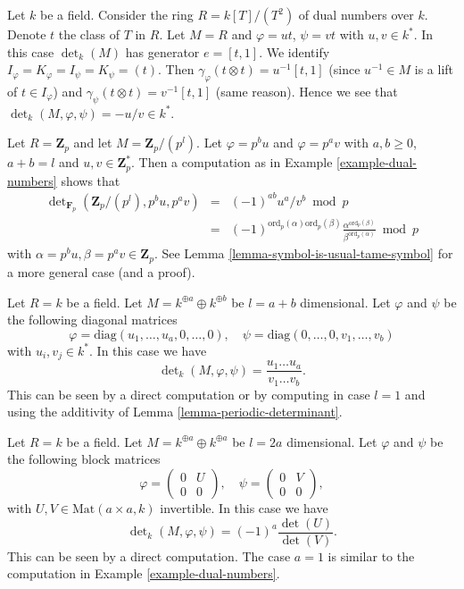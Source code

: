 \begin{example}
\label{example-dual-numbers}
Let $k$ be a field.
Consider the ring $R = k[T]/(T^2)$ of dual numbers over $k$.
Denote $t$ the class of $T$ in $R$.
Let $M = R$ and $\varphi = ut$, $\psi = vt$ with $u, v \in k^*$.
In this case $\det_k(M)$ has generator $e = [t, 1]$.
We identify $I_\varphi = K_\varphi = I_\psi = K_\psi = (t)$.
Then $\gamma_\varphi(t \otimes t) = u^{-1}[t, 1]$
(since $u^{-1} \in M$ is a lift of $t \in I_\varphi$)
and $\gamma_\psi(t \otimes t) = v^{-1}[t, 1]$ (same reason).
Hence we see that $\det_k(M, \varphi, \psi) = -u/v \in k^*$.
\end{example}

\begin{example}
\label{example-Zp}
Let $R = \mathbf{Z}_p$ and let $M = \mathbf{Z}_p/(p^l)$.
Let $\varphi = p^b u$ and $\varphi = p^a v$ with $a, b \geq 0$,
$a + b = l$ and $u, v \in \mathbf{Z}_p^*$.
Then a computation as in Example \ref{example-dual-numbers}
shows that
\begin{eqnarray*}
\det\nolimits_{\mathbf{F}_p}(\mathbf{Z}_p/(p^l), p^bu, p^av) & = &
(-1)^{ab}u^a/v^b \bmod p \\
& = &
(-1)^{\text{ord}_p(\alpha)\text{ord}_p(\beta)}
\frac{\alpha^{\text{ord}_p(\beta)}}{\beta^{\text{ord}_p(\alpha)}} \bmod p
\end{eqnarray*}
with $\alpha = p^bu, \beta = p^av \in \mathbf{Z}_p$.
See Lemma \ref{lemma-symbol-is-usual-tame-symbol}
for a more general case (and a proof).
\end{example}

\begin{example}
\label{example-generic-vector-space}
Let $R = k$ be a field.
Let $M = k^{\oplus a} \oplus k^{\oplus b}$ be $l = a + b$ dimensional.
Let $\varphi$ and $\psi$ be the following diagonal matrices
$$
\varphi = \text{diag}(u_1, \ldots, u_a, 0, \ldots, 0),
\quad
\psi = \text{diag}(0, \ldots, 0, v_1, \ldots, v_b)
$$
with $u_i, v_j \in k^*$. In this case we have
$$
\det\nolimits_k(M, \varphi, \psi)
=
\frac{u_1 \ldots u_a}{v_1 \ldots v_b}.
$$
This can be seen by a direct computation or by computing in case $l = 1$
and using the additivity of Lemma \ref{lemma-periodic-determinant}.
\end{example}

\begin{example}
\label{example-special-vector-space}
Let $R = k$ be a field.
Let $M = k^{\oplus a} \oplus k^{\oplus a}$ be $l = 2a$ dimensional.
Let $\varphi$ and $\psi$ be the following block matrices
$$
\varphi =
\left(
\begin{matrix}
0 & U \\
0 & 0
\end{matrix}
\right),
\quad
\psi =
\left(
\begin{matrix}
0 & V \\
0 & 0
\end{matrix}
\right),
$$
with $U, V \in \text{Mat}(a \times a, k)$ invertible.
In this case we have
$$
\det\nolimits_k(M, \varphi, \psi)
=
(-1)^a\frac{\det(U)}{\det(V)}.
$$
This can be seen by a direct computation.
The case $a = 1$ is similar to the computation in
Example \ref{example-dual-numbers}.
\end{example}


